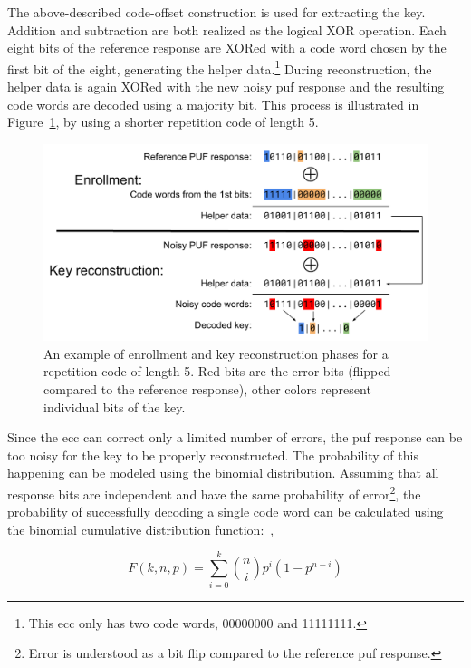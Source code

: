The above-described code-offset construction is used for extracting the key. Addition and subtraction are both realized as the logical XOR operation. Each eight bits of the reference response are XORed with a code word chosen by the first bit of the eight, generating the helper data.\footnote{This \gls{ecc} only has two code words, 00000000 and 11111111.} During reconstruction, the helper data is again XORed with the new noisy \gls{puf} response and the resulting code words are decoded using a majority bit. This process is illustrated in Figure~\ref{fig:ecc_diagram}, by using a shorter repetition code of length 5.

\begin{figure}[ht!]
    \centering
    \captionsetup{margin=0.5cm}
    \includegraphics[width=\textwidth]{images/ecc_diagram.pdf}
    \caption[An example of enrollment and key reconstruction phases for a repetition code of length 5.]{An example of enrollment and key reconstruction phases for a repetition code of length 5. Red bits are the error bits (flipped compared to the reference response), other colors represent individual bits of the key.~\cite{Kodytek2017}}
    \label{fig:ecc_diagram}
\end{figure}

Since the \gls{ecc} can correct only a limited number of errors, the \gls{puf} response can be too noisy for the key to be properly reconstructed. The probability of this happening can be modeled using the binomial distribution. Assuming that all response bits are independent and have the same probability of error\footnote{Error is understood as a bit flip compared to the reference \gls{puf} response.}, the probability of successfully decoding a single code word can be calculated using the binomial cumulative distribution function:~\cite{Iluminada2015},~\cite{Bosch2008}

\begin{equation}\label{eq:binomial_cdf}
    F(k, n, p) = \sum_{i=0}^{k}\binom{n}{i}p^{i}(1-p^{n-i})
\end{equation}

